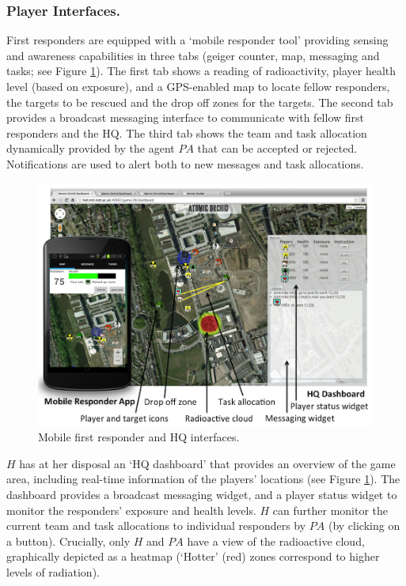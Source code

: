 \subsubsection{Player Interfaces.}
\noindent First responders are equipped with a `mobile responder tool' providing sensing and awareness capabilities in three tabs (geiger cou\-nter, map, messaging and tasks; see Figure \ref{fig:ui}). The first tab shows a reading of radioactivity, player health level (based on exposure), and a GPS-enabled map to locate fellow responders, the targets to be rescued and the drop off zones for the targets. The second tab provides a broadcast messaging interface to communicate with fellow first responders and the HQ. The third tab shows the team and task allocation dynamically provided by the agent $PA$ that can be accepted or rejected. Notifications are used to alert both to new messages and task allocations.

\begin{figure}[htbp]
\includegraphics{UI.png}
\caption{Mobile first responder and HQ interfaces.}\label{fig:ui}
\end{figure}

$H$ has at her disposal an `HQ dashboard' that provides an over\-view of the game area, including real-time information of the players' locations (see Figure \ref{fig:ui}). The dashboard provides a broadcast messaging widget, and a player status widget to monitor the responders' exposure and health levels. $H$ can further monitor the current team and task allocations to individual responders by $PA$ (by clicking on a button). Crucially, only $H$ and $PA$ have a view of the radioactive cloud, graphically depicted as a heatmap (`Hotter' (red) zones correspond to higher levels of radiation).

